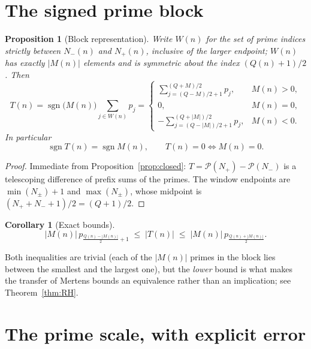\documentclass[11pt]{amsart}
\numberwithin{equation}{section}
\theoremstyle{plain}
\newtheorem{proposition}[theorem]{Proposition}
\newtheorem{corollary}[theorem]{Corollary}
\theoremstyle{definition}
\theoremstyle{remark}
\newcommand{\Mert}{M}
\newcommand{\Sq}{Q}
\newcommand{\PS}{\mathcal P}
\begin{document}
\section{The signed prime block}
\label{sec:block}

\begin{proposition}[Block representation]\label{prop:block}
Write $W(n)$ for the set of prime indices strictly between $N_-(n)$ and
$N_+(n)$, inclusive of the larger endpoint; $W(n)$ has exactly $|\Mert(n)|$
elements and is symmetric about the index $(\Sq(n)+1)/2$. Then
\begin{equation}
\label{eq:block-representation}
T(n)=\operatorname{sgn}\bigl(\Mert(n)\bigr)\sum_{j\in W(n)}p_j
=
\begin{cases}
\displaystyle\sum_{j=(\Sq-\Mert)/2+1}^{(\Sq+\Mert)/2}p_j, & \Mert(n)>0,\\[5mm]
0,& \Mert(n)=0,\\[2mm]
\displaystyle-\sum_{j=(\Sq-|\Mert|)/2+1}^{(\Sq+|\Mert|)/2}p_j, & \Mert(n)<0 .
\end{cases}
\end{equation}
In particular
\begin{equation}
\label{eq:block-sign}
\operatorname{sgn}T(n)=\operatorname{sgn}\Mert(n),
\qquad
T(n)=0\iff \Mert(n)=0 .
\end{equation}
\end{proposition}

\begin{proof}
Immediate from Proposition~\ref{prop:closed}: $T=\PS(N_+)-\PS(N_-)$ is a
telescoping difference of prefix sums of the primes. The window endpoints are
$\min(N_\pm)+1$ and $\max(N_\pm)$, whose midpoint is
$(N_++N_-+1)/2=(\Sq+1)/2$.
\end{proof}

\begin{corollary}[Exact bounds]\label{cor:bounds}
\begin{equation}
\label{eq:block-bounds}
|\Mert(n)|\,p_{\frac{\Sq(n)-|\Mert(n)|}{2}+1}
\;\le\;
|T(n)|
\;\le\;
|\Mert(n)|\,p_{\frac{\Sq(n)+|\Mert(n)|}{2}} .
\end{equation}
\end{corollary}

Both inequalities are trivial (each of the $|\Mert(n)|$ primes in the block lies
between the smallest and the largest one), but the \emph{lower} bound is what
makes the transfer of Mertens bounds an equivalence rather than an implication;
see Theorem~\ref{thm:RH}.

\section{The prime scale, with explicit error}
\label{sec:prime-scale}
\end{document}
